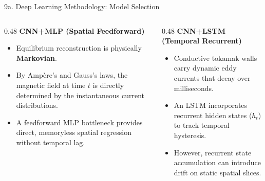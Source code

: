 \documentclass[aspectratio=169, 10pt]{beamer}
\begin{document}
\begin{frame}{9a. Deep Learning Methodology: Model Selection}
  \begin{columns}[T]
    \begin{column}{0.48\textwidth}
      \textbf{\color{NavyBlue} CNN+MLP (Spatial Feedforward)}
      \begin{itemize}
        \item Equilibrium reconstruction is physically \textbf{Markovian}.
        \item By Ampère's and Gauss's laws, the magnetic field at time $t$ is directly determined by the instantaneous current distributions.
        \item A feedforward MLP bottleneck provides direct, memoryless spatial regression without temporal lag.
      \end{itemize}
    \end{column}

    \begin{column}{0.48\textwidth}
      \textbf{\color{NavyBlue} CNN+LSTM (Temporal Recurrent)}
      \begin{itemize}
        \item Conductive tokamak walls carry dynamic eddy currents that decay over milliseconds.
        \item An LSTM incorporates recurrent hidden states ($h_t$) to track temporal hysteresis.
        \item However, recurrent state accumulation can introduce drift on static spatial slices.
      \end{itemize}
    \end{column}
  \end{columns}
\end{frame}
\end{document}
